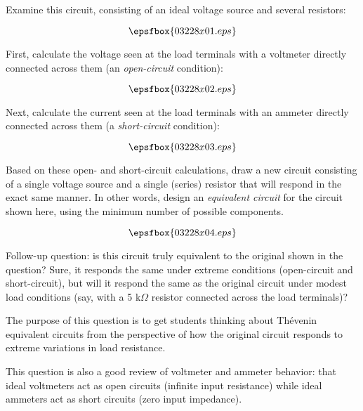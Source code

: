 

Examine this circuit, consisting of an ideal voltage source and several resistors:

$$\epsfbox{03228x01.eps}$$

First, calculate the voltage seen at the load terminals with a voltmeter directly connected across them (an {\it open-circuit} condition):

$$\epsfbox{03228x02.eps}$$

Next, calculate the current seen at the load terminals with an ammeter directly connected across them (a {\it short-circuit} condition):

$$\epsfbox{03228x03.eps}$$

Based on these open- and short-circuit calculations, draw a new circuit consisting of a single voltage source and a single (series) resistor that will respond in the exact same manner.  In other words, design an {\it equivalent circuit} for the circuit shown here, using the minimum number of possible components.







$$\epsfbox{03228x04.eps}$$

\vskip 10pt

Follow-up question: is this circuit truly equivalent to the original shown in the question?  Sure, it responds the same under extreme conditions (open-circuit and short-circuit), but will it respond the same as the original circuit under modest load conditions (say, with a 5 k$\Omega$ resistor connected across the load terminals)?







The purpose of this question is to get students thinking about Th\'evenin equivalent circuits from the perspective of how the original circuit responds to extreme variations in load resistance.

This question is also a good review of voltmeter and ammeter behavior: that ideal voltmeters act as open circuits (infinite input resistance) while ideal ammeters act as short circuits (zero input impedance).




